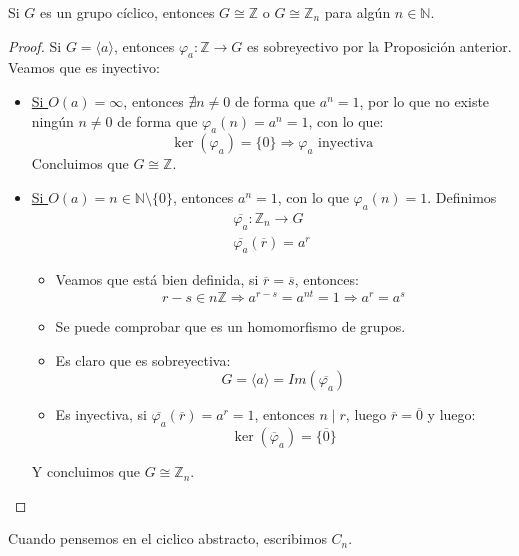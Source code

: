 \begin{teo}
    Si $G$ es un grupo cíclico, entonces $G\cong \mathbb{Z}$ o $G\cong \mathbb{Z}_n$ para algún $n\in \mathbb{N}$.
    \begin{proof}
        Si $G = \langle a \rangle $, entonces $\varphi_a:\mathbb{Z}\to G$ es sobreyectivo por la Proposición anterior. Veamos que es inyectivo:
        \begin{itemize}
            \item \underline{Si $O(a)=\infty$}, entonces $\nexists n\neq 0$ de forma que $a^n = 1$, por lo que no existe ningún $n\neq 0$ de forma que $\varphi_a(n) = a^n = 1$, con lo que:
                \begin{equation*}
                    \ker(\varphi_a) = \{0\} \Longrightarrow \varphi_a \text{\ inyectiva}
                \end{equation*}
                Concluimos que $G\cong \mathbb{Z}$.
            \item \underline{Si $O(a)=n \in \mathbb{N}\setminus\{0\}$}, entonces $a^n =1$, con lo que $\varphi_a(n) = 1$. Definimos
                \begin{gather*}
                    \overline{\varphi_a}:\mathbb{Z}_n \to G\\
                    \overline{\varphi_a}(\overline{r}) = a^r
                \end{gather*}
                \begin{itemize}
                    \item Veamos que está bien definida, si $\overline{r}=\overline{s}$, entonces:
                        \begin{equation*}
                            r-s\in n\mathbb{Z} \Longrightarrow a^{r-s} = a^{nt} = 1 \Longrightarrow a^r = a^s
                        \end{equation*}
                    \item Se puede comprobar que es un homomorfismo de grupos.
                    \item Es claro que es sobreyectiva:
                        \begin{equation*}
                            G = \langle a \rangle  = Im(\overline{\varphi_a})
                        \end{equation*}
                    \item Es inyectiva, si $\overline{\varphi_a}(\overline{r}) = a^r = 1$, entonces $n\mid r$, luego $\overline{r} = \overline{0}$ y luego:
                        \begin{equation*}
                            \ker(\overline{\varphi}_a) = \{\overline{0}\}
                        \end{equation*}
                \end{itemize}
                Y concluimos que $G\cong \mathbb{Z}_n$.
        \end{itemize}
    \end{proof}
\end{teo}

Cuando pensemos en el ciclico abstracto, escribimos $C_n$.
